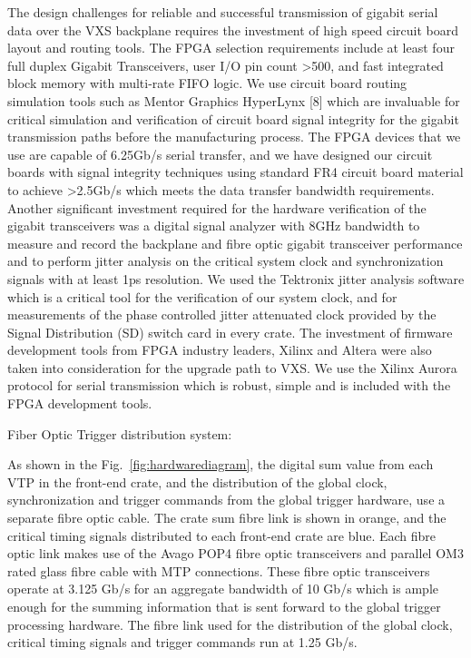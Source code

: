 The design challenges for reliable and successful transmission of gigabit serial data over the VXS backplane requires the investment of high speed circuit board layout and routing tools.  The FPGA selection requirements include at least four full duplex Gigabit Transceivers, user I/O pin count >500, and fast integrated block memory with multi-rate FIFO logic. We use circuit board routing simulation tools such as Mentor Graphics HyperLynx [8] which are invaluable for critical simulation and verification of circuit board signal integrity for the gigabit transmission paths before the manufacturing process.  The FPGA devices that we use are capable of 6.25Gb/s serial transfer, and we have designed our circuit boards with signal integrity techniques using standard FR4 circuit board material to achieve >2.5Gb/s which meets the data transfer bandwidth requirements. 
Another significant investment required for the hardware verification of the gigabit transceivers was a digital signal analyzer with 8GHz bandwidth to measure and record the backplane and fibre optic gigabit transceiver performance and to perform jitter analysis on the critical system clock and synchronization signals with at least 1ps resolution.  We used the Tektronix jitter analysis software which is a critical tool for the verification of our system clock, and for measurements of the phase controlled jitter attenuated clock provided by the Signal Distribution (SD) switch card in every crate.
The investment of firmware development tools from FPGA industry leaders, Xilinx and Altera were also taken into consideration for the upgrade path to VXS.
We use the Xilinx Aurora protocol for serial transmission which is robust, simple and is included with the FPGA development tools.  

Fiber Optic Trigger distribution system:

As shown in the Fig.~\ref{fig:hardwarediagram}, the digital sum value from each VTP in the front-end crate, and the distribution of the global clock, synchronization and trigger commands from the global trigger hardware, use a separate fibre optic cable.  The crate sum fibre link is shown in orange, and the critical timing signals distributed to each front-end crate are blue.  Each fibre optic link makes use of the Avago POP4 fibre optic transceivers and parallel OM3 rated glass fibre cable with MTP connections.  These fibre optic transceivers operate at 3.125 Gb/s for an aggregate bandwidth of 10 Gb/s which is ample enough for the summing information that is sent forward to the global trigger processing hardware.  The fibre link used for the distribution of the global clock, critical timing signals and trigger commands run at 1.25 Gb/s.

